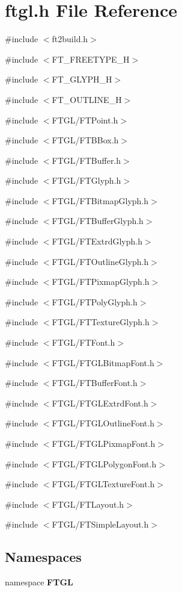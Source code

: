 \section{ftgl.h File Reference}
\label{ftgl_8h}
{\ttfamily \#include $<$ft2build.h$>$}\par
{\ttfamily \#include $<$FT\_\-FREETYPE\_\-H$>$}\par
{\ttfamily \#include $<$FT\_\-GLYPH\_\-H$>$}\par
{\ttfamily \#include $<$FT\_\-OUTLINE\_\-H$>$}\par
{\ttfamily \#include $<$FTGL/FTPoint.h$>$}\par
{\ttfamily \#include $<$FTGL/FTBBox.h$>$}\par
{\ttfamily \#include $<$FTGL/FTBuffer.h$>$}\par
{\ttfamily \#include $<$FTGL/FTGlyph.h$>$}\par
{\ttfamily \#include $<$FTGL/FTBitmapGlyph.h$>$}\par
{\ttfamily \#include $<$FTGL/FTBufferGlyph.h$>$}\par
{\ttfamily \#include $<$FTGL/FTExtrdGlyph.h$>$}\par
{\ttfamily \#include $<$FTGL/FTOutlineGlyph.h$>$}\par
{\ttfamily \#include $<$FTGL/FTPixmapGlyph.h$>$}\par
{\ttfamily \#include $<$FTGL/FTPolyGlyph.h$>$}\par
{\ttfamily \#include $<$FTGL/FTTextureGlyph.h$>$}\par
{\ttfamily \#include $<$FTGL/FTFont.h$>$}\par
{\ttfamily \#include $<$FTGL/FTGLBitmapFont.h$>$}\par
{\ttfamily \#include $<$FTGL/FTBufferFont.h$>$}\par
{\ttfamily \#include $<$FTGL/FTGLExtrdFont.h$>$}\par
{\ttfamily \#include $<$FTGL/FTGLOutlineFont.h$>$}\par
{\ttfamily \#include $<$FTGL/FTGLPixmapFont.h$>$}\par
{\ttfamily \#include $<$FTGL/FTGLPolygonFont.h$>$}\par
{\ttfamily \#include $<$FTGL/FTGLTextureFont.h$>$}\par
{\ttfamily \#include $<$FTGL/FTLayout.h$>$}\par
{\ttfamily \#include $<$FTGL/FTSimpleLayout.h$>$}\par
\subsection*{Namespaces}
\begin{DoxyCompactItemize}
\item 
namespace {\bf FTGL}
\end{DoxyCompactItemize}
